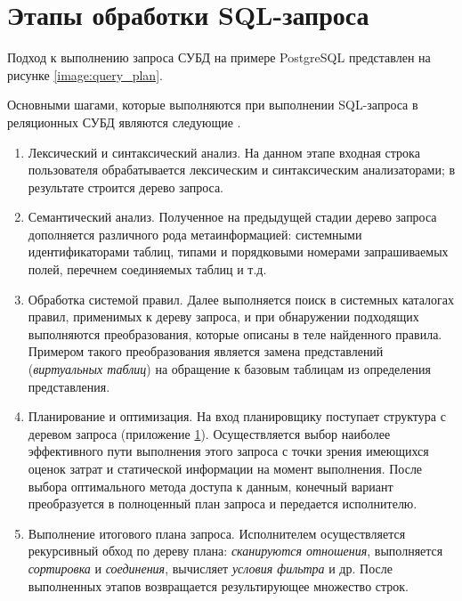 \section{Этапы обработки SQL-запроса}
Подход к выполнению запроса СУБД на примере PostgreSQL представлен на рисунке \ref{image:query_plan}.
\begin{figure}[H]
\end{figure}

Основными шагами, которые выполняются при выполнении SQL-запроса в реляционных СУБД являются следующие \cite{stages_sql_query}.

\begin{enumerate}
	\item Лексический и синтаксический анализ. На данном этапе входная строка пользователя обрабатывается лексическим и синтаксическим анализаторами; в результате строится дерево запроса.
	\item Семантический анализ. Полученное на предыдущей стадии дерево запроса дополняется различного рода метаинформацией: системными идентификаторами таблиц, типами и порядковыми номерами запрашиваемых полей, перечнем соединяемых таблиц и т.д.
	\item Обработка системой правил. Далее выполняется поиск в системных каталогах правил, применимых к дереву запроса, и при обнаружении подходящих выполняются преобразования, которые описаны в теле найденного правила. Примером такого преобразования является замена представлений (\textit{виртуальных таблиц}) на обращение к базовым таблицам из определения представления.
	\item Планирование и оптимизация. На вход планировщику поступает структура с деревом запроса (приложение \ref{}). Осуществляется выбор наиболее эффективного пути выполнения этого запроса с точки зрения имеющихся оценок затрат и статической информации на момент выполнения.  После выбора оптимального метода доступа к данным, конечный вариант преобразуется в полноценный план запроса и передается исполнителю. 
	\item Выполнение итогового плана запроса. Исполнителем осуществляется рекурсивный обход по дереву плана: \textit{сканируются отношения}, выполняется \textit{сортировка} и \textit{соединения}, вычисляет \textit{условия фильтра} и др. После выполненных этапов возвращается результирующее множество строк.
\end{enumerate}

